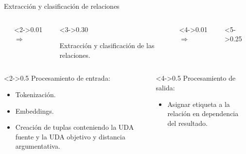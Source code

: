 \documentclass{beamer}
\begin{document}
\begin{frame}{Extracción y clasificación de relaciones}

    \begin{columns}
        \begin{column}{0.25\textwidth}
            
        \end{column}
        \begin{column}<2->{0.01\textwidth}
            \begin{math}
                \Rightarrow
            \end{math}
        \end{column}
        \begin{column}<3->{0.30\textwidth}
            \begin{block}{}
                Extracción y clasificación de las relaciones.
            \end{block}
        \end{column}
        \begin{column}<4->{0.01\textwidth}
            \begin{math}
                \Rightarrow
            \end{math}
        \end{column}
        \begin{column}<5->{0.25\textwidth}
            
        \end{column}
    \end{columns}

    \vspace{1cm}

    \begin{columns}[T]
        \begin{column}<2->{0.5\textwidth}
            Procesamiento de entrada:
            \begin{itemize}
                \item Tokenización.
                \item Embeddings.
                \item Creación de tuplas conteniendo la UDA fuente y la UDA objetivo y distancia argumentativa.
            \end{itemize}
        \end{column}
        \begin{column}<4->{0.5\textwidth}
            Procesamiento de salida:
            \begin{itemize}
                \item Asignar etiqueta a la relación en dependencia del resultado.
            \end{itemize}
        \end{column}
    \end{columns}
\end{frame}
\end{document}

